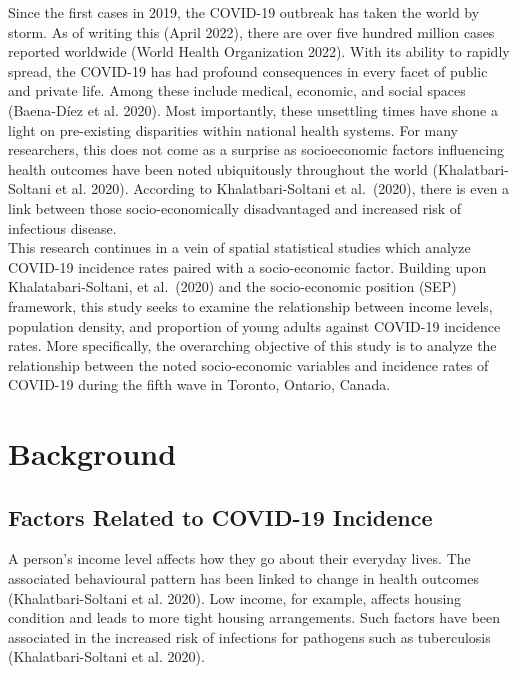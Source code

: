 \documentclass[]{article}
\begin{document}
Since the first cases in 2019, the COVID-19 outbreak has taken the world
by storm. As of writing this (April 2022), there are over five hundred
million cases reported worldwide (World Health Organization 2022). With
its ability to rapidly spread, the COVID-19 has had profound
consequences in every facet of public and private life. Among these
include medical, economic, and social spaces (Baena-Díez et al. 2020).
Most importantly, these unsettling times have shone a light on
pre-existing disparities within national health systems. For many
researchers, this does not come as a surprise as socioeconomic factors
influencing health outcomes have been noted ubiquitously throughout the
world (Khalatbari-Soltani et al. 2020). According to Khalatbari-Soltani
et al.~(2020), there is even a link between those socio-economically
disadvantaged and increased risk of infectious disease.\\
This research continues in a vein of spatial statistical studies which
analyze COVID-19 incidence rates paired with a socio-economic factor.
Building upon Khalatabari-Soltani, et al.~(2020) and the socio-economic
position (SEP) framework, this study seeks to examine the relationship
between income levels, population density, and proportion of young
adults against COVID-19 incidence rates. More specifically, the
overarching objective of this study is to analyze the relationship
between the noted socio-economic variables and incidence rates of
COVID-19 during the fifth wave in Toronto, Ontario, Canada.

\hypertarget{background}{%
\section{Background}\label{background}}

\hypertarget{factors-related-to-covid-19-incidence}{%
\subsection{Factors Related to COVID-19
Incidence}\label{factors-related-to-covid-19-incidence}}

A person's income level affects how they go about their everyday lives.
The associated behavioural pattern has been linked to change in health
outcomes (Khalatbari-Soltani et al. 2020). Low income, for example,
affects housing condition and leads to more tight housing arrangements.
Such factors have been associated in the increased risk of infections
for pathogens such as tuberculosis (Khalatbari-Soltani et al. 2020).
\end{document}
